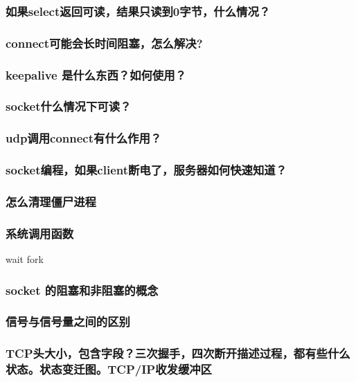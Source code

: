 \documentclass[UTF8,a4paper,8pt]{ctexart}
\begin{document}
		\subsubsection{如果select返回可读，结果只读到0字节，什么情况？}
		
		\subsubsection{connect可能会长时间阻塞，怎么解决?}
		
		\subsubsection{keepalive 是什么东西？如何使用？}
		
		\subsubsection{socket什么情况下可读？}
		
		\subsubsection{udp调用connect有什么作用？}
		
		\subsubsection{socket编程，如果client断电了，服务器如何快速知道？}
			
		\subsubsection{怎么清理僵尸进程}
		
		\subsubsection{系统调用函数} wait fork
		
		\subsubsection{socket 的阻塞和非阻塞的概念}
		
		\subsubsection{信号与信号量之间的区别}
		
		\subsubsection{TCP头大小，包含字段？三次握手，四次断开描述过程，都有些什么状态。状态变迁图。TCP/IP收发缓冲区}
		
\end{document}
